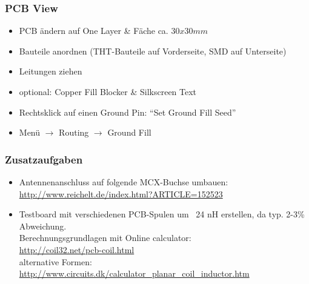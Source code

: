 \subsubsection{PCB View}

\begin{itemize}
    \item PCB ändern auf One Layer \& Fäche ca. $30x30mm$
    \item Bauteile anordnen (THT-Bauteile auf Vorderseite, SMD auf Unterseite)
    \item Leitungen ziehen
    \item optional: Copper Fill Blocker \& Silkscreen Text
    \item Rechtsklick auf einen Ground Pin: "`Set Ground Fill Seed"'
    \item Menü $\rightarrow$ Routing $\rightarrow$ Ground Fill
\end{itemize}

\subsubsection{Zusatzaufgaben}

\begin{itemize}
    \item Antennenanschluss auf folgende MCX-Buchse umbauen: \\
          \url{http://www.reichelt.de/index.html?ARTICLE=152523}
    \item Testboard mit verschiedenen PCB-Spulen um ~24 nH erstellen, da typ. 2-3\% Abweichung. \\
          Berechnungsgrundlagen mit Online calculator:\\
          \url{http://coil32.net/pcb-coil.html}\\
          alternative Formen: \\
          \url{http://www.circuits.dk/calculator_planar_coil_inductor.htm}
\end{itemize}
